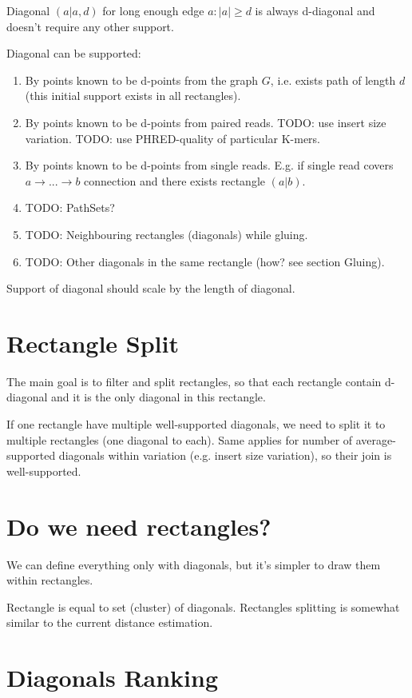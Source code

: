 \documentclass[a4paper]{article}
\begin{document}
Diagonal $(a|a, d)$ for long enough edge $a: |a| \geq d$ is always d-diagonal and doesn't require any other support.

Diagonal can be supported:
\begin{enumerate}
\item By points known to be d-points from the graph $G$, i.e. exists path of length $d$ (this initial support exists in all rectangles).
\item By points known to be d-points from paired reads. TODO: use insert size variation. TODO: use PHRED-quality of particular K-mers.
\item By points known to be d-points from single reads. E.g. if single read covers $a \rightarrow ... \rightarrow b$ connection and there exists rectangle $(a|b)$.
\item TODO: PathSets?
\item TODO: Neighbouring rectangles (diagonals) while gluing.
\item TODO: Other diagonals in the same rectangle (how? see section Gluing).
\end{enumerate}

Support of diagonal should scale by the length of diagonal.

\section{Rectangle Split}

The main goal is to filter and split rectangles, so that each rectangle contain d-diagonal and it is the only diagonal in this rectangle.

If one rectangle have multiple well-supported diagonals, we need to split it to multiple rectangles (one diagonal to each). Same applies for number of average-supported diagonals within variation (e.g. insert size variation), so their join is well-supported.

\section{Do we need rectangles?}

We can define everything only with diagonals, but it's simpler to draw them within rectangles.

Rectangle is equal to set (cluster) of diagonals. Rectangles splitting is somewhat similar to the current distance estimation.

\section{Diagonals Ranking}
\end{document}
